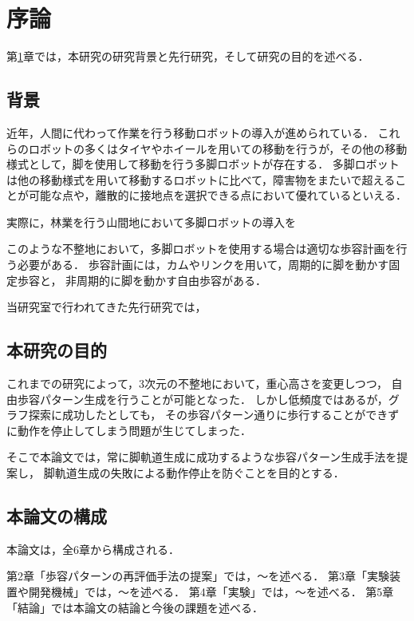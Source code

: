 ﻿%

\chapter{序論}\label{chapter:序論}
第\ref{chapter:序論}章では，本研究の研究背景と先行研究，そして研究の目的を述べる．


\section{背景}
近年，人間に代わって作業を行う移動ロボットの導入が進められている．
これらのロボットの多くはタイヤやホイールを用いての移動を行うが，その他の移動様式として，脚を使用して移動を行う多脚ロボットが存在する．
多脚ロボットは他の移動様式を用いて移動するロボットに比べて，障害物をまたいで超えることが可能な点や，離散的に接地点を選択できる点において優れているといえる．

実際に，林業を行う山間地において多脚ロボットの導入を

このような不整地において，多脚ロボットを使用する場合は適切な歩容計画を行う必要がある．
歩容計画には，カムやリンクを用いて，周期的に脚を動かす固定歩容と，
非周期的に脚を動かす自由歩容がある．

当研究室で行われてきた先行研究では，

\section{本研究の目的}
これまでの研究によって，3次元の不整地において，重心高さを変更しつつ，
自由歩容パターン生成を行うことが可能となった．
しかし低頻度ではあるが，グラフ探索に成功したとしても，
その歩容パターン通りに歩行することができずに動作を停止してしまう問題が生じてしまった．

そこで本論文では，常に脚軌道生成に成功するような歩容パターン生成手法を提案し，
脚軌道生成の失敗による動作停止を防ぐことを目的とする．

\section{本論文の構成}
本論文は，全6章から構成される．

第2章「歩容パターンの再評価手法の提案」では，～を述べる．
第3章「実験装置や開発機械」では，～を述べる．
第4章「実験」では，～を述べる．
第5章「結論」では本論文の結論と今後の課題を述べる．

